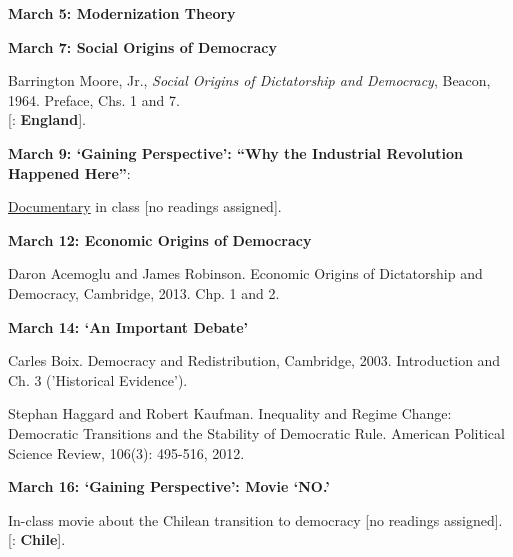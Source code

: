 \documentclass[letterpaper]{article}
\renewenvironment{itemize}{
  \begin{list}{}{
    \setlength{\leftmargin}{1.5em}
  }
}{
  \end{list}
}
\begin{document}
\begin{enumerate}
\begin{itemize} {\bf March 5: Modernization Theory}
		\item {\bf March 7: Social Origins of Democracy}
				\begin{itemize}
					\item[$\bullet$] Barrington Moore, Jr., \emph{Social Origins of Dictatorship and Democracy}, Beacon, 1964. Preface, Chs. 1 and 7.\\
			{\color{brown}[\faGlobe: {\bf England}].}

				\end{itemize}

		\item {\bf March 9: `Gaining Perspective': ``Why the Industrial Revolution Happened Here''}:
				\begin{itemize}
					\item[$\bullet$] \href{https://www.youtube.com/watch?v=UM2Aw4kmA0s}{Documentary} in class [no readings assigned].
				\end{itemize}
				
		\item {\bf March 12: Economic Origins of Democracy}
 				\begin{itemize}
					\item[$\bullet$] Daron Acemoglu and James Robinson. Economic Origins of Dictatorship and Democracy, Cambridge, 2013. Chp. 1 and 2.
				\end{itemize}

		\item {\bf March 14: `An Important Debate'}
 				\begin{itemize}
					\item[$\bullet$] Carles Boix. Democracy and Redistribution, Cambridge, 2003. Introduction and Ch. 3 ('Historical Evidence').
					\item[$\bullet$] Stephan Haggard and Robert Kaufman. Inequality and Regime Change: Democratic Transitions and the Stability of Democratic Rule. American Political Science Review, 106(3): 495-516, 2012.
				\end{itemize}

		\item {\bf March 16: `Gaining Perspective': Movie `NO.'}
 				\begin{itemize}
					\item[$\bullet$] In-class movie about the Chilean transition to democracy [no readings assigned].\\
			{\color{brown}[\faGlobe: {\bf Chile}].}

				\end{itemize}


\end{itemize}
\end{enumerate}
\end{document}
